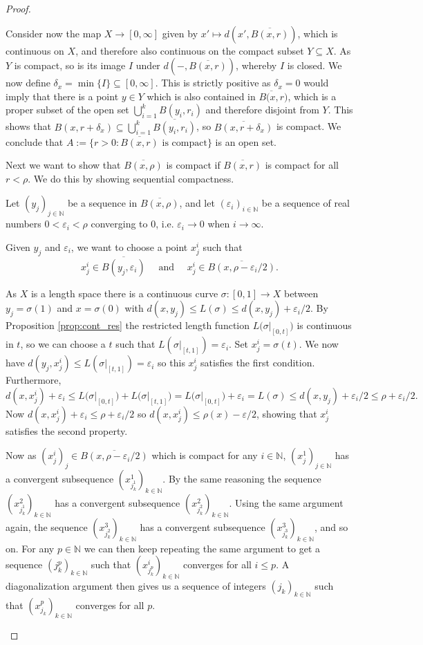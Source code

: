 \documentclass[11pt, a4paper, oneside]{memoir}
\theoremstyle{plain}\newtheorem{theorem}[subsection]{Theorem}
\theoremstyle{definition}
\newcommand{\N}{\mathbb{N}}
\newcommand{\length}[2][\sigma]{\left.L(#1\right|_{#2})}
\begin{document}
\begin{proof}
\begin{enumerate}
Consider now the map \(X\to [0,\infty]\) given by \(x'\mapsto d(x',\overline{B(x,r)})\), which is continuous on \(X\), and therefore also continuous on the compact subset \(Y\subseteq X\).
As \(Y\) is compact, so is its image \(I\) under \(d(-,\overline{B(x,r)})\), whereby \(I\) is closed.
We now define \(\delta_x=\min \{I\}\subseteq [0,\infty]\).
This is strictly positive as \(\delta_x=0\) would imply that there is a point \(y\in Y\) which is also contained in \(\overline{B(x,r})\), which is a proper subset of the open set \(\bigcup_{i=1}^k B(y_i,r_i)\) and therefore disjoint from \(Y\).
This shows that \(B(x,r+\delta_x)\subseteq \bigcup_{i=1}^k \overline{B(y_i,r_i)}\), so \(\overline{B(x,r+\delta_x)}\) is compact.
We conclude that \(A:=\{r>0:\overline{B(x,r)}\text{ is compact}\}\) is an open set.

Next we want to show that \(\overline{B(x,\rho)}\) is compact if \(\overline{B(x,r)}\) is compact for all \(r<\rho\).
We do this by showing sequential compactness.

Let \((y_j)_{j\in\N}\) be a sequence in \(\overline{B(x,\rho)}\), and let \((\varepsilon_i)_{i\in\N}\) be a sequence of real numbers \(0<\varepsilon_i<\rho\) converging to 0, i.e. \(\varepsilon_i\to 0\) when \(i\to \infty\).

Given \(y_j\) and \(\varepsilon_i\), we want to choose a point \(x_j^i\) such that 
\[x_j^i\in \overline{B(y_j,\varepsilon_i)}\quad\text{ and }\quad x_j^i\in \overline{B(x,\rho-\varepsilon_i/2)}.\]

As \(X\) is a length space there is a continuous curve \(\sigma:[0,1]\to X\) between \(y_j=\sigma(1)\) and \(x=\sigma(0)\) with \(d(x,y_j)\leq L(\sigma)\leq d(x,y_j)+\varepsilon_i/2\).
By Proposition \ref{prop:cont_res} the restricted length function \(\length{[0,t]}\) is continuous in \(t\), so we can choose a \(t\) such that \(L(\sigma|_{[t,1]})=\varepsilon_i\).
Set \(x_j^i=\sigma(t)\).
We now have \(d(y_j,x_j^i)\leq L(\sigma|_{[t,1]})=\varepsilon_i\) so this \(x_j^i\) satisfies the first condition.
Furthermore, 
\[d(x,x_j^i)+\varepsilon_i\leq \length{[0,t]}+\length{[t,1]}=\length{[0,t]}+\varepsilon_i= L(\sigma)\leq d(x,y_j)+\varepsilon_i/2\leq\rho+\varepsilon_i/2.\]
Now \(d(x,x_j^i)+\varepsilon_i\leq\rho+\varepsilon_i/2\) so \(d(x,x_j^i)\leq \rho(x)-\varepsilon/2\), showing that \(x_j^i\) satisfies the second property.

Now as \((x_j^i)_j\in \overline{B(x,\rho-\varepsilon_i/2)}\) which is compact for any \(i\in \N\), \((x_j^1)_{j\in\N}\) has a convergent subsequence \((x_{j_k^1}^1)_{k\in\N}\).
By the same reasoning the sequence \((x_{j_k^1}^2)_{k\in\N}\) has a convergent subsequence \((x_{j_k^2}^2)_{k\in\N}\).
Using the same argument again, the sequence \((x_{j_k^2}^3)_{k\in\N}\) has a convergent subsequence \((x_{j_k^3}^3)_{k\in\N}\), and so on.
For any \(p\in\N\) we can then keep repeating the same argument to get a sequence \((j_k^p)_{k\in\N}\) such that \((x_{j_k^p}^i)_{k\in\N}\) converges for all \(i\leq p\).
A diagonalization argument then gives us a sequence of integers \((j_k)_{k\in\N}\) such that \((x_{j_k}^p)_{k\in\N}\) converges for all \(p\).


\end{enumerate}
\end{proof}
\end{document}
